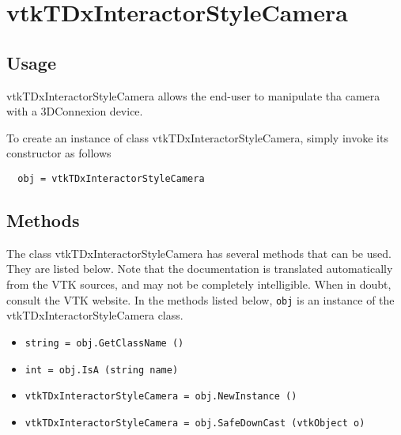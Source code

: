 \section{vtkTDxInteractorStyleCamera}

\subsection{Usage}

 vtkTDxInteractorStyleCamera allows the end-user to manipulate tha camera
 with a 3DConnexion device.

To create an instance of class vtkTDxInteractorStyleCamera, simply
invoke its constructor as follows
\begin{verbatim}
  obj = vtkTDxInteractorStyleCamera
\end{verbatim}
\subsection{Methods}

The class vtkTDxInteractorStyleCamera has several methods that can be used.
  They are listed below.
Note that the documentation is translated automatically from the VTK sources,
and may not be completely intelligible.  When in doubt, consult the VTK website.
In the methods listed below, \verb|obj| is an instance of the vtkTDxInteractorStyleCamera class.
\begin{itemize}
\item  \verb|string = obj.GetClassName ()|

\item  \verb|int = obj.IsA (string name)|

\item  \verb|vtkTDxInteractorStyleCamera = obj.NewInstance ()|

\item  \verb|vtkTDxInteractorStyleCamera = obj.SafeDownCast (vtkObject o)|

\end{itemize}
